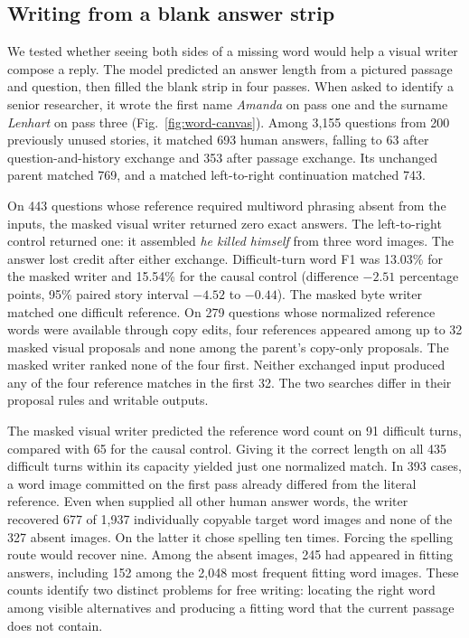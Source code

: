 \subsection*{Writing from a blank answer strip}
We tested whether seeing both sides of a missing word would help a visual writer compose a reply. The model predicted an answer length from a pictured passage and question, then filled the blank strip in four passes. When asked to identify a senior researcher, it wrote the first name \emph{Amanda} on pass one and the surname \emph{Lenhart} on pass three (Fig.~\ref{fig:word-canvas}). Among 3,155 questions from 200 previously unused stories, it matched 693 human answers, falling to 63 after question-and-history exchange and 353 after passage exchange. Its unchanged parent matched 769, and a matched left-to-right continuation matched 743.

On 443 questions whose reference required multiword phrasing absent from the inputs, the masked visual writer returned zero exact answers. The left-to-right control returned one: it assembled \emph{he killed himself} from three word images. The answer lost credit after either exchange. Difficult-turn word F1 was 13.03\% for the masked writer and 15.54\% for the causal control (difference $-2.51$ percentage points, 95\% paired story interval $-4.52$ to $-0.44$). The masked byte writer matched one difficult reference. On 279 questions whose normalized reference words were available through copy edits, four references appeared among up to 32 masked visual proposals and none among the parent's copy-only proposals. The masked writer ranked none of the four first. Neither exchanged input produced any of the four reference matches in the first 32. The two searches differ in their proposal rules and writable outputs.

The masked visual writer predicted the reference word count on 91 difficult turns, compared with 65 for the causal control. Giving it the correct length on all 435 difficult turns within its capacity yielded just one normalized match. In 393 cases, a word image committed on the first pass already differed from the literal reference. Even when supplied all other human answer words, the writer recovered 677 of 1,937 individually copyable target word images and none of the 327 absent images. On the latter it chose spelling ten times. Forcing the spelling route would recover nine. Among the absent images, 245 had appeared in fitting answers, including 152 among the 2,048 most frequent fitting word images. These counts identify two distinct problems for free writing: locating the right word among visible alternatives and producing a fitting word that the current passage does not contain.
